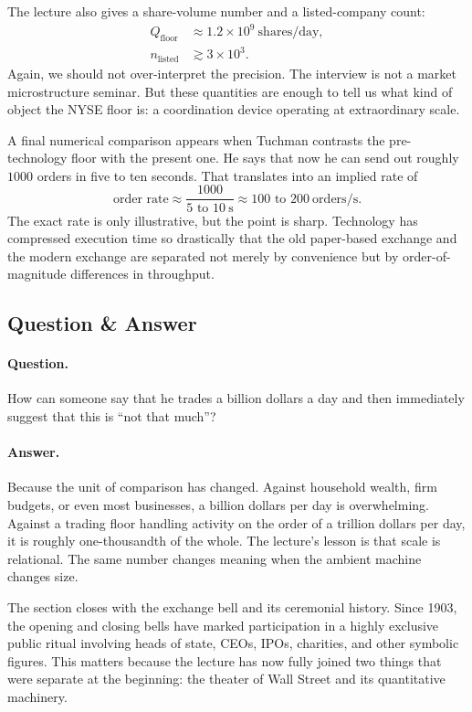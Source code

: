 The lecture also gives a share-volume number and a listed-company count:
\begin{align}
Q_{\mathrm{floor}} &\approx 1.2\times 10^9\ \mathrm{shares/day},\\
n_{\mathrm{listed}} &\gtrsim 3\times 10^3.
\end{align}
Again, we should not over-interpret the precision. The interview is not a market microstructure seminar. But these quantities are enough to tell us what kind of object the NYSE floor is: a coordination device operating at extraordinary scale.

A final numerical comparison appears when Tuchman contrasts the pre-technology floor with the present one. He says that now he can send out roughly $1000$ orders in five to ten seconds. That translates into an implied rate of
\begin{equation}
\text{order rate} \approx \frac{1000}{5\text{ to }10\ \mathrm{s}} \approx 100\text{ to }200\ \mathrm{orders/s}.
\end{equation}
The exact rate is only illustrative, but the point is sharp. Technology has compressed execution time so drastically that the old paper-based exchange and the modern exchange are separated not merely by convenience but by order-of-magnitude differences in throughput.

\subsection{Question \& Answer}

\paragraph{Question.} How can someone say that he trades a billion dollars a day and then immediately suggest that this is ``not that much''?

\paragraph{Answer.} Because the unit of comparison has changed. Against household wealth, firm budgets, or even most businesses, a billion dollars per day is overwhelming. Against a trading floor handling activity on the order of a trillion dollars per day, it is roughly one-thousandth of the whole. The lecture's lesson is that scale is relational. The same number changes meaning when the ambient machine changes size.

The section closes with the exchange bell and its ceremonial history. Since 1903, the opening and closing bells have marked participation in a highly exclusive public ritual involving heads of state, CEOs, IPOs, charities, and other symbolic figures. This matters because the lecture has now fully joined two things that were separate at the beginning: the theater of Wall Street and its quantitative machinery.

